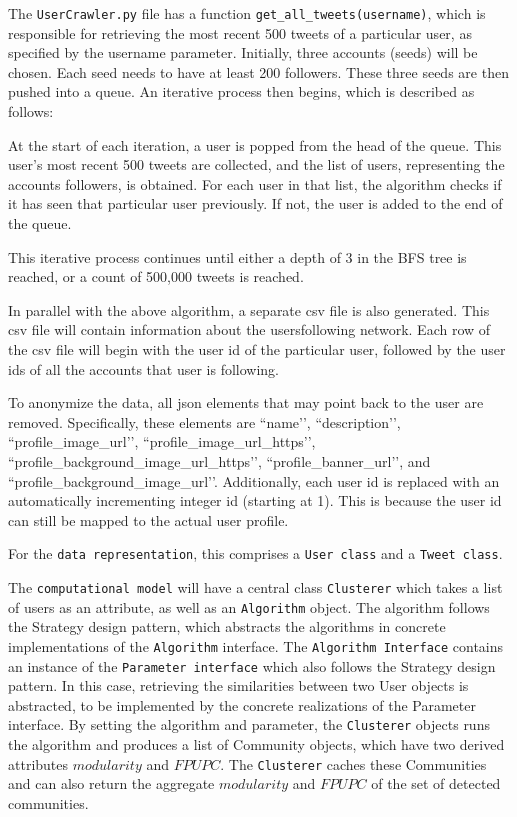 The \texttt{UserCrawler.py} file has a function \texttt{get\_all\_tweets(username)}, which is responsible for retrieving the most recent 500 tweets of a particular user, as specified by the username parameter. Initially, three accounts (seeds) will be chosen. Each seed needs to have at least 200 followers. These three seeds are then pushed into a queue. An iterative process then begins, which is described as follows:




At the start of each iteration, a user is popped from the head of the queue. This user’s most recent 500 tweets are collected, and the list of users, representing the account\vtick s followers, is obtained. For each user in that list, the algorithm checks if it has seen that particular user previously. If not, the user is added to the end of the queue.




This iterative process continues until either a depth of 3 in the BFS tree is reached, or a count of 500,000 tweets is reached.




In parallel with the above algorithm, a separate csv file is also generated. This csv file will contain information about the users\vtick following network. Each row of the csv file will begin with the user id of the particular user, followed by the user id\vtick s of all the accounts that user is following.




To anonymize the data, all json elements that may point back to the user are removed. Specifically, these elements are ``name’’, ``description’’, ``profile\_image\_url’’, ``profile\_image\_url\_https’’, ``profile\_background\_image\_url\_https’’, ``profile\_banner\_url’’, and ``profile\_background\_image\_url’’. Additionally, each user id is replaced with an automatically incrementing integer id (starting at 1). This is because the user id can still be mapped to the actual user profile.




For the \texttt{data representation}, this comprises a \texttt{User class} and a \texttt{Tweet class}.


The \texttt{computational model} will have a central class \texttt{Clusterer} which takes a list of users as an attribute, 
as well as an \texttt{Algorithm} object. The algorithm follows the Strategy design pattern, which abstracts the algorithms in
concrete implementations of the \texttt{Algorithm} interface. The \texttt{Algorithm Interface} contains an instance of the \texttt{Parameter interface}
which also follows the Strategy design pattern. In this case, retrieving the similarities between two User objects is abstracted,
to be implemented by the concrete realizations of the Parameter interface. By setting the algorithm and parameter, the \texttt{Clusterer} objects 
runs the algorithm and produces a list of Community objects, which have two derived attributes $modularity$ and $FPUPC$. The \texttt{Clusterer} caches
these Communities and can also return the aggregate $modularity$ and $FPUPC$ of the set of detected communities.


